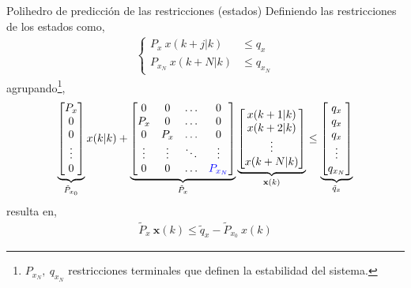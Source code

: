 \documentclass[8pt]{beamer}
\begin{document}
\begin{frame}[fragile]{Polihedro de predicción de las restricciones (estados)}	
	Definiendo las restricciones de los estados como,
	\begin{align*}
	\begin{cases}
	P_x~x(k+j|k) &\leq q_x\\
	P_{x_N}~x(k+N|k) &\leq q_{x_N}
	\end{cases}
	\end{align*}
	agrupando\footnote{$P_{x_N},~q_{x_N}$ restricciones terminales que definen la estabilidad del sistema.},
	\begin{equation*}
	\begin{aligned}
	\underbrace{
		\begin{bmatrix}
		P_x\\
		0\\
		0\\
		\vdots\\
		0
		\end{bmatrix}
	}_{\tilde{P}_{x_0}}
	x(k|k)
	+
	\underbrace{
		\begin{bmatrix}
			0      & 0      & \dots  & 0                        \\
			P_x    & 0      & \dots  & 0                        \\
			0      & P_x    & \dots  & 0                        \\
			\vdots & \vdots & \ddots & \vdots                   \\
			0      & 0      & \dots  & { \color{blue} P_{x_N} }
		\end{bmatrix}
	}_{\tilde{P}_x}
	\underbrace{
		\begin{bmatrix}
		x(k+1|k)\\
		x(k+2|k)\\
		\vdots\\
		x(k+N|k)
		\end{bmatrix}
	}_{\mathbf{x}(k)}
	\leq
	\underbrace{
		\begin{bmatrix}
		q_x\\
		q_x\\
		q_x\\
		\vdots\\
		q_{x_N}
		\end{bmatrix}
	}_{\tilde{q}_x}
	\end{aligned}
	\end{equation*}
	resulta en,
	\begin{align}\label{eq:Px_tilde}
	\tilde{P}_x~\mathbf{x}(k)\leq \tilde{q}_x - \tilde{P}_{x_0}~x(k)
	\end{align}
	
	
\end{frame}
\end{document}
